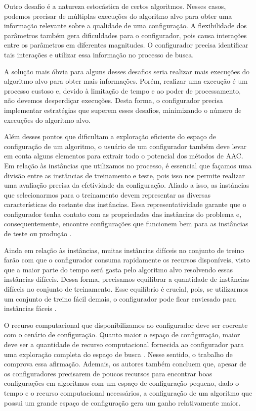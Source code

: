 Outro desafio é a natureza estocástica de certos algoritmos. Nesses casos, podemos precisar de múltiplas execuções do algoritmo alvo para obter uma informação relevante sobre a qualidade de uma configuração. A flexibilidade dos parâmetros também gera dificuldades para o configurador, pois causa interações entre os parâmetros em diferentes magnitudes. O configurador precisa identificar tais interações e utilizar essa informação no processo de busca.

A solução mais óbvia para alguns desses desafios seria realizar mais execuções do algoritmo alvo para obter mais informações. Porém, realizar uma execução é um processo custoso e, devido à limitação de tempo e ao poder de processamento, não devemos desperdiçar execuções. Desta forma, o configurador precisa implementar estratégias que superem esses desafios, minimizando o número de execuções do algoritmo alvo.

Além desses pontos que dificultam a exploração eficiente do espaço de configuração de um algoritmo, o usuário de um configurador também deve levar em conta alguns elementos para extrair todo o potencial dos métodos de \ac{AAC}. Em relação às instâncias que utilizamos no processo, é essencial que façamos uma divisão entre as instâncias de treinamento e teste, pois isso nos permite realizar uma avaliação precisa da efetividade da configuração. Aliado a isso, as instâncias que selecionarmos para o treinamento devem representar as diversas características do restante das instâncias. Essa representatividade garante que o configurador tenha contato com as propriedades das instâncias do problema e, consequentemente, encontre configurações que funcionem bem para as instâncias de teste ou produção \citep{eggensperger2019pitfalls}.

Ainda em relação às instâncias, muitas instâncias difíceis no conjunto de treino farão com que o configurador consuma rapidamente os recursos disponíveis, visto que a maior parte do tempo será gasta pelo algoritmo alvo resolvendo essas instâncias difíceis. Dessa forma, precisamos equilibrar a quantidade de instâncias difíceis no conjunto de treinamento. Esse equilíbrio é crucial, pois, se utilizarmos um conjunto de treino fácil demais, o configurador pode ficar enviesado para instâncias fáceis \citep{eggensperger2019pitfalls}.

O recurso computacional que disponibilizamos ao configurador deve ser coerente com o cenário de configuração. Quanto maior o espaço de configuração, maior deve ser a quantidade de recurso computacional fornecida ao configurador para uma exploração completa do espaço de busca \citep{eggensperger2019pitfalls}. Nesse sentido, o trabalho de \cite{hutter2017configurable} comprova essa afirmação. Ademais, os autores também concluem que, apesar de os configuradores precisarem de poucos recursos para encontrar boas configurações em algoritmos com um espaço de configuração pequeno, dado o tempo e o recurso computacional necessários, a configuração de um algoritmo que possui um grande espaço de configuração gera um ganho relativamente maior.

